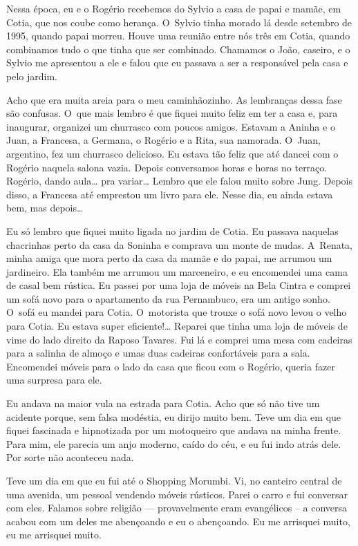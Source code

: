 Nessa época, eu e o Rogério recebemos do Sylvio a casa de papai e mamãe,
em Cotia, que nos coube como herança. O~Sylvio tinha morado lá desde
setembro de 1995, quando papai morreu. Houve uma reunião entre nós três
em Cotia, quando combinamos tudo o que tinha que ser combinado. Chamamos
o João, caseiro, e o Sylvio me apresentou a ele e falou que eu passava a
ser a responsável pela casa e pelo jardim.

Acho que era muita areia para o meu caminhãozinho. As lembranças dessa
fase são confusas. O~que mais lembro é que fiquei muito feliz em ter a
casa e, para inaugurar, organizei um churrasco com poucos amigos.
Estavam a Aninha e o Juan, a Francesa, a Germana, o Rogério e a Rita,
sua namorada. O~Juan, argentino, fez um churrasco delicioso. Eu estava
tão feliz que até dancei com o Rogério naquela salona vazia. Depois
conversamos horas e horas no terraço. Rogério, dando aula… pra
variar… Lembro que ele falou muito sobre Jung. Depois disso, a
Francesa até emprestou um livro para ele. Nesse dia, eu ainda estava
bem, mas depois…

Eu só lembro que fiquei muito ligada no jardim de Cotia. Eu passava
naquelas chacrinhas perto da casa da Soninha e comprava um monte de
mudas. A~Renata, minha amiga que mora perto da casa da mamãe e do papai,
me arrumou um jardineiro. Ela também me arrumou um marceneiro, e eu
encomendei uma cama de casal bem rústica. Eu passei por uma loja de
móveis na Bela Cintra e comprei um sofá novo para o apartamento da rua
Pernambuco, era um antigo sonho. O~sofá eu mandei para Cotia. O~motorista que trouxe o sofá novo levou o velho para Cotia. Eu estava
super eficiente!… Reparei que tinha uma loja de móveis de vime do
lado direito da Raposo Tavares. Fui lá e comprei uma mesa com cadeiras
para a salinha de almoço e umas duas cadeiras confortáveis para a sala.
Encomendei móveis para o lado da casa que ficou com o Rogério, queria
fazer uma surpresa para ele.

Eu andava na maior vula na estrada para Cotia. Acho que só não tive um
acidente porque, sem falsa modéstia, eu dirijo muito bem. Teve um dia em
que fiquei fascinada e hipnotizada por um motoqueiro que andava na minha
frente. Para mim, ele parecia um anjo moderno, caído do céu, e eu fui
indo atrás dele. Por sorte não aconteceu nada.

Teve um dia em que eu fui até o Shopping Morumbi. Vi, no canteiro
central de uma avenida, um pessoal vendendo móveis rústicos. Parei o
carro e fui conversar com eles. Falamos sobre religião --- provavelmente
eram evangélicos -- a conversa acabou com um deles me abençoando e eu o
abençoando. Eu me arrisquei muito, eu me arrisquei muito.

